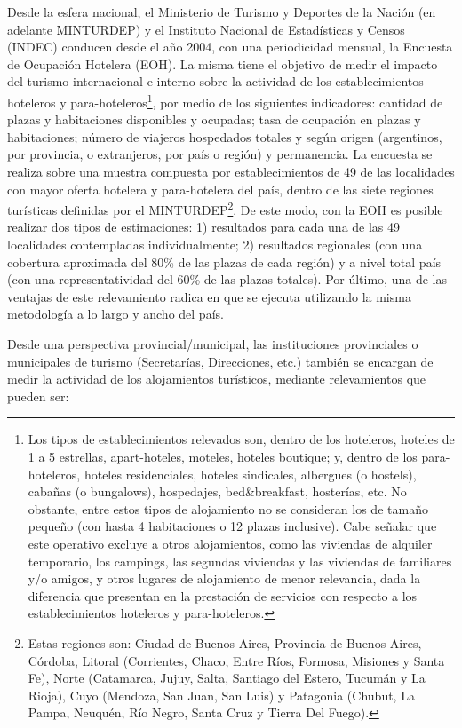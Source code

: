 \documentclass[
]{book}
\begin{document}
Desde la esfera nacional, el Ministerio de Turismo y Deportes de la Nación (en adelante MINTURDEP) y el Instituto Nacional de Estadísticas y Censos (INDEC) conducen desde el año 2004, con una periodicidad mensual, la Encuesta de Ocupación Hotelera (EOH). La misma tiene el objetivo de medir el impacto del turismo internacional e interno sobre la actividad de los establecimientos hoteleros y para-hoteleros\footnote{Los tipos de establecimientos relevados son, dentro de los hoteleros, hoteles de 1 a 5 estrellas, apart-hoteles, moteles, hoteles boutique; y, dentro de los para-hoteleros, hoteles residenciales, hoteles sindicales, albergues (o hostels), cabañas (o bungalows), hospedajes, bed\&breakfast, hosterías, etc. No obstante, entre estos tipos de alojamiento no se consideran los de tamaño pequeño (con hasta 4 habitaciones o 12 plazas inclusive). Cabe señalar que este operativo excluye a otros alojamientos, como las viviendas de alquiler temporario, los campings, las segundas viviendas y las viviendas de familiares y/o amigos, y otros lugares de alojamiento de menor relevancia, dada la diferencia que presentan en la prestación de servicios con respecto a los establecimientos hoteleros y para-hoteleros.}, por medio de los siguientes indicadores: cantidad de plazas y habitaciones disponibles y ocupadas; tasa de ocupación en plazas y habitaciones; número de viajeros hospedados totales y según origen (argentinos, por provincia, o extranjeros, por país o región) y permanencia. La encuesta se realiza sobre una muestra compuesta por establecimientos de 49 de las localidades con mayor oferta hotelera y para-hotelera del país, dentro de las siete regiones turísticas definidas por el MINTURDEP\footnote{Estas regiones son: Ciudad de Buenos Aires, Provincia de Buenos Aires, Córdoba, Litoral (Corrientes, Chaco, Entre Ríos, Formosa, Misiones y Santa Fe), Norte (Catamarca, Jujuy, Salta, Santiago del Estero, Tucumán y La Rioja), Cuyo (Mendoza, San Juan, San Luis) y Patagonia (Chubut, La Pampa, Neuquén, Río Negro, Santa Cruz y Tierra Del Fuego).}. De este modo, con la EOH es posible realizar dos tipos de estimaciones: 1) resultados para cada una de las 49 localidades contempladas individualmente; 2) resultados regionales (con una cobertura aproximada del 80\% de las plazas de cada región) y a nivel total país (con una representatividad del 60\% de las plazas totales). Por último, una de las ventajas de este relevamiento radica en que se ejecuta utilizando la misma metodología a lo largo y ancho del país.

Desde una perspectiva provincial/municipal, las instituciones provinciales o municipales de turismo (Secretarías, Direcciones, etc.) también se encargan de medir la actividad de los alojamientos turísticos, mediante relevamientos que pueden ser:
\end{document}
